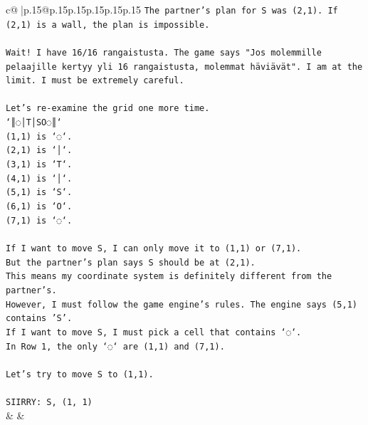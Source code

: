 \documentclass{article}
\begin{document}
{\begin{supertabular}{c@{$\;$}|p{.15\linewidth}@{}p{.15\linewidth}p{.15\linewidth}p{.15\linewidth}p{.15\linewidth}p{.15\linewidth}}
{{{\texttt{The partner's plan for S was (2,1). If (2,1) is a wall, the plan is impossible.} \\
\\ 
\texttt{Wait! I have 16/16 rangaistusta. The game says "Jos molemmille pelaajille kertyy yli 16 rangaistusta, molemmat häviävät". I am at the limit. I must be extremely careful.} \\
\\ 
\texttt{Let's re{-}examine the grid one more time.} \\
\texttt{`║◌│T│SO◌║`} \\
\texttt{(1,1) is `◌`.} \\
\texttt{(2,1) is `│`.} \\
\texttt{(3,1) is `T`.} \\
\texttt{(4,1) is `│`.} \\
\texttt{(5,1) is `S`.} \\
\texttt{(6,1) is `O`.} \\
\texttt{(7,1) is `◌`.} \\
\\ 
\texttt{If I want to move S, I can only move it to (1,1) or (7,1).} \\
\texttt{But the partner's plan says S should be at (2,1).} \\
\texttt{This means my coordinate system is definitely different from the partner's.} \\
\texttt{However, I must follow the game engine's rules. The engine says (5,1) contains 'S'.} \\
\texttt{If I want to move S, I must pick a cell that contains `◌`.} \\
\texttt{In Row 1, the only `◌` are (1,1) and (7,1).} \\
\\ 
\texttt{Let's try to move S to (1,1).} \\
\\ 
\texttt{SIIRRY: S, (1, 1)} \\
            }
        }
    }
    & & \\ \\


\end{supertabular}}
\end{document}
